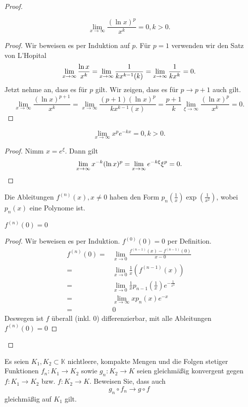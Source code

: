 \begin{proof}
\begin{enumerate}[label=\roman*)]
			\begin{Lemma}
				\[
				\lim_{x \to \infty} \frac{(\ln x)^p}{x^k}=0, k > 0
				.\] 
			\end{Lemma}
			\begin{proof}
				Wir beweisen es per Induktion auf $p$. F\"{u}r $p=1$ verwenden wir den Satz von L'Hopital
				\[
					\lim_{x \to \infty} \frac{\ln x}{x^k}=\lim_{x \to \infty} \frac{1}{kx^{k-1}(k)}=\lim_{x \to \infty} \frac{1}{kx^k}=0
				.\qedhere\] 
				Jetzt nehme an, dass es f\"{u}r $p$ gilt. Wir zeigen, dass es f\"{u}r $p\to p+1$ auch gilt. 
				\[
					\lim_{x \to \infty} \frac{(\ln x)^{p+1}}{x^k}=\lim_{x \to \infty} \frac{(p+1)(\ln x)^p}{kx^{k-1}(x)}=\frac{p+1}{k}\lim_{\xi \to \infty} \frac{(\ln x)^p}{x^k}=0
				.\] 
			\end{proof}
			\begin{Lemma}
			\[
				\lim_{x \to \infty} x^p e^{-kx}=0, k>0
			.\] 	
			\end{Lemma}
			\begin{proof}
				Nimm $x=e^\xi$. Dann gilt
				\[
					\lim_{x \to \infty} x^{-k}(\ln x)^p=\lim_{x \to \infty} e^{-k\xi}\xi^p=0
				.\qedhere\] 
			\end{proof}
			Die Ableitungen $f^{(n)}(x), x\neq 0$ haben den Form $p_n\left( \frac{1}{x} \right) \exp\left( \frac{1}{x^2} \right) $, wobei $p_n(x)$ eine Polynome ist. 
			\begin{Proposition}
				$f^{(n)}(0)=0$
			\end{Proposition}
			\begin{proof}
				Wir beweisen es per Induktion. $f^{(0)}(0)=0$ per Definition.
				\begin{align*}
					f^{(n)}(0)=&\lim_{x \to 0} \frac{f^{(n-1)}(x)-f^{(n-1)}(0)}{x-0}\\
					=&\lim_{x \to 0}  \frac{1}{x}\left( f^{(n-1)}(x) \right)\\
					=&\lim_{x \to 0} \frac{1}{x}p_{n-1}\left(\frac{1}{x}\right)e^{-\frac{1}{x^2}}\\
					=&\lim_{x \to \infty} xp_n(x)e^{-x}\\
					=&0
				\end{align*}
				Deswegen ist $f$ überall (inkl. 0) differenzierbar, mit alle Ableitungen $f^{(n)}(0)=0$
			\end{proof}
	\end{enumerate}
\end{proof}
\begin{Problem}
	Es seien $K_1 , K_2 \subset \mathbb{K}$  nichtleere, kompakte Mengen und die Folgen stetiger Funktionen $f_n : K_1 \to K_2$ sowie $g_n : K_2 \to K$  seien gleichmäßig konvergent gegen $f : K_1 \to K_2$ bzw. $f : K_2 \to K$. Beweisen Sie, dass auch
	\[
	g_n\circ f_n \to g \circ f\]
	gleichmäßig auf $K_1$ gilt.
\end{Problem}

